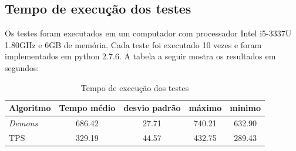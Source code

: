 \subsection{Tempo de execução dos testes}
	Os testes foram executados em um computador com processador Intel i5-3337U 1.80GHz e 6GB de memória. Cada teste foi
executado 10 vezes e foram implementados em python 2.7.6. A tabela a seguir mostra os resultados em segundos:

\begin{table}[H]
\begin{center}
\begin{tabular}{|l|c|c|c|c|}
\hline
Algoritmo & Tempo médio & desvio padrão & máximo & minimo \\
\hline
\textit{Demons} & 686.42 & 27.71 & 740.21 & 632.90 \\
\hline
TPS & 329.19 & 44.57 & 432.75 & 289.43 \\
\hline
\end{tabular}
\caption{Tempo de execução dos testes}
\label{table:tps}
\end{center}
\end{table}